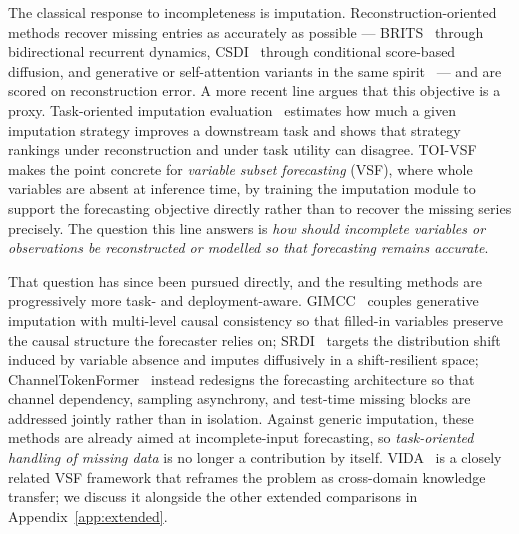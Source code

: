 \documentclass{article}
\begin{document}
The classical response to incompleteness is imputation. Reconstruction-oriented methods
recover missing entries as accurately as possible --- BRITS~\citep{cao2018brits} through
bidirectional recurrent dynamics, CSDI~\citep{tashiro2021csdi} through conditional
score-based diffusion, and generative or self-attention variants in the same
spirit~\citep{yoon2018gain,du2023saits} --- and are scored on reconstruction error. A more
recent line argues that this objective is a proxy. Task-oriented imputation
evaluation~\citep{wang2024taskoriented} estimates how much a given imputation strategy
improves a downstream task and shows that strategy rankings under reconstruction and under
task utility can disagree. TOI-VSF~\citep{hao2025toivsf} makes the point concrete for
\emph{variable subset forecasting} (VSF), where whole variables are absent at inference
time, by training the imputation module to support the forecasting objective directly rather
than to recover the missing series precisely. The question this line answers is
\emph{how should incomplete variables or observations be reconstructed or modelled so that
forecasting remains accurate}.

That question has since been pursued directly, and the resulting methods are progressively
more task- and deployment-aware. GIMCC~\citep{hao2025gimcc} couples generative imputation
with multi-level causal consistency so that filled-in variables preserve the causal structure
the forecaster relies on; SRDI~\citep{xu2026srdi} targets the distribution shift induced by
variable absence and imputes diffusively in a shift-resilient space;
ChannelTokenFormer~\citep{jang2026channeltokenformer} instead redesigns the forecasting
architecture so that channel dependency, sampling asynchrony, and test-time missing blocks
are addressed jointly rather than in isolation. Against generic imputation, these methods are
already aimed at incomplete-input forecasting, so \emph{task-oriented handling of missing
data} is no longer a contribution by itself. VIDA~\citep{liang2025vida} is a closely related
VSF framework that reframes the problem as cross-domain knowledge transfer; we discuss it
alongside the other extended comparisons in Appendix~\ref{app:extended}.
\end{document}
